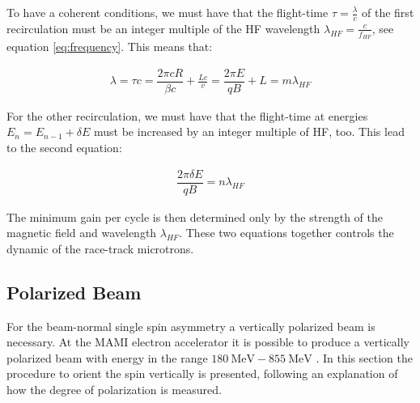 To have a coherent conditions, we must have that the flight-time $\tau = \frac{\lambda}{c}$ of the first recirculation must be an integer multiple of the HF wavelength $\lambda_{HF} = \frac{c}{f_{HF}}$, see equation \ref{eq:frequency}. This means that:

\begin{align*}
\lambda = \tau c =\dfrac{ 2 \pi c R }{\beta c} + \frac{Lc}{v} = \dfrac{2 \pi E}{q B} + L = m \lambda_{HF}
\end{align*}

For the other recirculation, we must have that the flight-time at energies $E_{n} = E_{n-1} + \delta E$ must be increased by an integer multiple of HF, too. This lead to the second equation:

\begin{align*}
\dfrac{2 \pi \delta E}{q B} = n \lambda_{HF}
\end{align*}

The minimum gain per cycle is then determined only by the strength of the magnetic field and wavelength $\lambda_{HF}$. These two equations together controls the dynamic of the race-track microtrons.

\subsection{Polarized Beam}

For the beam-normal single spin asymmetry a vertically polarized beam is necessary. At the MAMI electron accelerator it is possible to produce a vertically polarized beam with energy in the range $\SI{180}{\mega \electronvolt} - \SI{855}{\mega \electronvolt}$ \cite{Schlimme:2016rrp}. In this section the procedure to orient the spin vertically is presented, following an explanation of how the degree of polarization is measured. \smallskip

